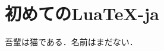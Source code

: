 \documentclass[a4j]{ltjsarticle}
\begin{document}
\section{初めてのLua\TeX-ja}
吾輩は猫である．名前はまだない．
\end{document}
